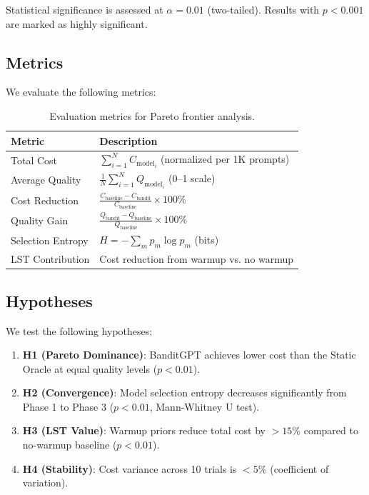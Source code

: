 Statistical significance is assessed at $\alpha = 0.01$ (two-tailed). Results with $p < 0.001$ are marked as highly significant.

\subsection{Metrics}

We evaluate the following metrics:

\begin{table}[h]
\centering
\small
\begin{tabular}{@{}ll@{}}
\toprule
\textbf{Metric} & \textbf{Description} \\ \midrule
Total Cost & $\sum_{i=1}^{N} C_{\text{model}_i}$ (normalized per 1K prompts) \\
Average Quality & $\frac{1}{N} \sum_{i=1}^{N} Q_{\text{model}_i}$ (0--1 scale) \\
Cost Reduction & $\frac{C_{\text{baseline}} - C_{\text{bandit}}}{C_{\text{baseline}}} \times 100\%$ \\
Quality Gain & $\frac{Q_{\text{bandit}} - Q_{\text{baseline}}}{Q_{\text{baseline}}} \times 100\%$ \\
Selection Entropy & $H = -\sum_m p_m \log p_m$ (bits) \\
LST Contribution & Cost reduction from warmup vs. no warmup \\
\bottomrule
\end{tabular}
\caption{Evaluation metrics for Pareto frontier analysis.}
\label{tab:metrics}
\end{table}

\subsection{Hypotheses}

We test the following hypotheses:

\begin{enumerate}
    \item \textbf{H1 (Pareto Dominance)}: BanditGPT achieves lower cost than the Static Oracle at equal quality levels ($p < 0.01$).
    
    \item \textbf{H2 (Convergence)}: Model selection entropy decreases significantly from Phase 1 to Phase 3 ($p < 0.01$, Mann-Whitney U test).
    
    \item \textbf{H3 (LST Value)}: Warmup priors reduce total cost by $>15\%$ compared to no-warmup baseline ($p < 0.01$).
    
    \item \textbf{H4 (Stability)}: Cost variance across 10 trials is $<5\%$ (coefficient of variation).
\end{enumerate}

